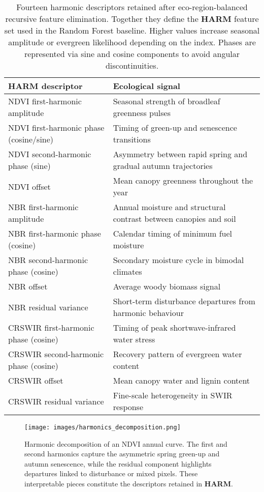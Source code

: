 \documentclass[utf8]{FrontiersinHarvard}
\begin{document}
\begin{table}[H]
    \centering
    \small
    \begin{tabular}{lp{}}
        \hline
        \textbf{HARM descriptor} & \textbf{Ecological signal} \\
        \hline
        NDVI first-harmonic amplitude & Seasonal strength of broadleaf greenness pulses \\
        NDVI first-harmonic phase (cosine/sine) & Timing of green-up and senescence transitions \\
        NDVI second-harmonic phase (sine) & Asymmetry between rapid spring and gradual autumn trajectories \\
        NDVI offset & Mean canopy greenness throughout the year \\
        NBR first-harmonic amplitude & Annual moisture and structural contrast between canopies and soil \\
        NBR first-harmonic phase (cosine) & Calendar timing of minimum fuel moisture \\
        NBR second-harmonic phase (cosine) & Secondary moisture cycle in bimodal climates \\
        NBR offset & Average woody biomass signal \\
        NBR residual variance & Short-term disturbance departures from harmonic behaviour \\
        CRSWIR first-harmonic phase (cosine) & Timing of peak shortwave-infrared water stress \\
        CRSWIR second-harmonic phase (cosine) & Recovery pattern of evergreen water content \\
        CRSWIR offset & Mean canopy water and lignin content \\
        CRSWIR residual variance & Fine-scale heterogeneity in SWIR response \\
        \hline
    \end{tabular}
    \caption{Fourteen harmonic descriptors retained after eco-region-balanced recursive feature elimination. Together they define the \textbf{HARM} feature set used in the Random Forest baseline. Higher values increase seasonal amplitude or evergreen likelihood depending on the index. Phases are represented via sine and cosine components to avoid angular discontinuities.}
    \label{tab:harmonic14}
\end{table}

\begin{figure}[H]
    \centering
    \texttt{[image: images/harmonics\_decomposition.png]}
    \caption{Harmonic decomposition of an NDVI annual curve. The first and second harmonics capture the asymmetric spring green-up and autumn senescence, while the residual component highlights departures linked to disturbance or mixed pixels. These interpretable pieces constitute the descriptors retained in \textbf{HARM}.}
    \label{fig:harmonics_decomposition}
\end{figure}
\end{document}
